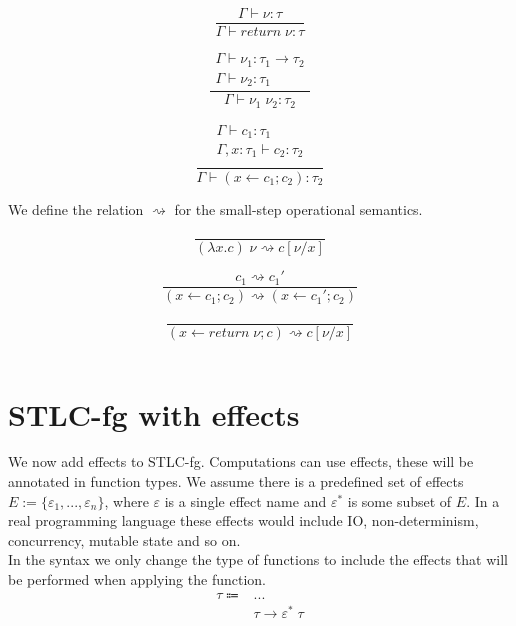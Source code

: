 \documentclass[12pt]{article}
\newcommand\eff[0]{\varepsilon}
\newcommand\steffs[0]{E}
\newcommand\effs[0]{\eff^*}
\newcommand\type[0]{\tau}
\newcommand\tarr[2]{#1 \rightarrow #2}
\newcommand\tarre[3]{#1 \rightarrow #2 \; #3}
\newcommand\val[0]{\nu}
\newcommand\vabs[2]{\lambda #1 . #2}
\newcommand\comp[0]{c}
\newcommand\creturn[1]{\textit{return} \; #1}
\newcommand\capp[2]{#1 \; #2}
\newcommand\cdo[3]{#1 \leftarrow #2 ; #3}
\begin{document}
\vspace{10pt}
\begin{minipage}{0.33\textwidth}
\[\frac{
	\begin{array}{l}
	\Gamma \vdash \val : \type
	\end{array}
}{
	\Gamma \vdash \creturn{\val} : \type
}\]
\end{minipage}
\begin{minipage}{0.33\textwidth}
\[\frac{
	\begin{array}{l}
	\Gamma \vdash \val_1 : \tarr{\type_1}{\type_2} \\
	\Gamma \vdash \val_2 : \type_1
	\end{array}
}{
	\Gamma \vdash \capp{\val_1}{\val_2} : \type_2
}\]
\end{minipage}
\begin{minipage}{0.33\textwidth}
\[\frac{
	\begin{array}{l}
	\Gamma \vdash \comp_1 : \type_1 \\
	\Gamma , x : \type_1 \vdash \comp_2 : \type_2 \\
	\end{array}
}{
	\Gamma \vdash (\cdo{x}{\comp_1}{\comp_2}) : \type_2
}\]
\end{minipage}

We define the relation $\rightsquigarrow$ for the small-step operational semantics. \\
\begin{minipage}{0.5\textwidth}
\[\frac{
}{
	\capp{(\vabs{x}{\comp})}{\val} \rightsquigarrow \comp[\val / x]
}\]
\end{minipage}
\begin{minipage}{0.5\textwidth}
\[\frac{
	\comp_1 \rightsquigarrow \comp_1'
}{
	(\cdo{x}{\comp_1}{\comp_2}) \rightsquigarrow (\cdo{x}{\comp_1'}{\comp_2})
}\]
\end{minipage}
\[\frac{
}{
	(\cdo{x}{\creturn{\val}}{\comp}) \rightsquigarrow \comp[\val / x]
}\]

\inputminted{haskell}{code1.txt}

\newpage
\section{STLC-fg with effects}
We now add effects to STLC-fg. Computations can use effects, these will be annotated in function types.
We assume there is a predefined set of effects $\steffs := \{ \eff_1, ..., \eff_n \}$, where $\eff$ is a single effect name and $\effs$ is some subset of $\steffs$.
In a real programming language these effects would include IO, non-determinism, concurrency, mutable state and so on.\\
In the syntax we only change the type of functions to include the effects that will be performed when applying the function.
\begin{align*}
	\type \Coloneqq 	& ...							\tag{types} \\
				& \tarre{\type}{\effs}{\type}			\tag{type of functions} \\
\end{align*}
\end{document}
